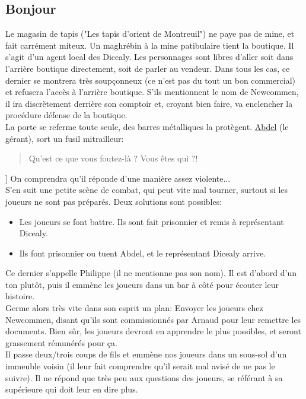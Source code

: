 \documentclass[10pt,a4paper,twocolumn]{article}
\begin{document}
\subsection*{Bonjour}
Le magasin de tapis ("Les tapis d'orient de Montreuil") ne paye pas de mine, et fait carrément miteux. Un maghrébin à la mine patibulaire tient la boutique. Il s'agit d'un agent local des Dicealy. Les personnages sont libres d'aller soit dans l'arrière boutique directement, soit de parler au vendeur. Dans tous les cas, ce dernier se montrera très soupçonneux (ce n'est pas du tout un bon commercial) et refusera l'accès à l'arrière boutique. S'ils mentionnent le nom de Newcommen, il ira discrètement derrière son comptoir et, croyant bien faire, va enclencher la procédure défense de la boutique.\\
La porte se referme toute seule, des barres métalliques la protègent. \hyperlink{abdel}{Abdel} (le gérant), sort un fusil mitrailleur:
\begin{quote}
Qu'est ce que vous foutez-là ? Vous êtes qui ?!
\end{quote}{]}
On comprendra qu'il réponde d'une manière assez violente... \\
S'en suit une petite scène de combat, qui peut vite mal tourner, surtout si les joueurs ne sont pas préparés. Deux solutions sont possibles:
\begin{itemize}
	\item Les joueurs se font battre. Ils sont fait prisonnier et remis à représentant Dicealy.
	\item Ils font prisonnier ou tuent Abdel, et le représentant Dicealy arrive.
\end{itemize}
Ce dernier s'appelle Philippe (il ne mentionne pas son nom). Il est d'abord d'un ton plutôt, puis il emmène les joueurs dans un bar à côté pour écouter leur histoire.\\
Germe alors très vite dans son esprit un plan: Envoyer les joueurs chez Newcommen, disant qu'ils sont commissionnés par Arnaud pour leur remettre les documents. Bien sûr, les joueurs devront en apprendre le plus possibles, et seront grassement rémunérés pour ça. \\
Il passe deux/trois coups de fils et emmène nos joueurs dans un sous-sol d'un immeuble voisin (il leur fait comprendre qu'il serait mal avisé de ne pas le suivre). Il ne répond que très peu aux questions des joueurs, se référant à sa supérieure qui doit leur en dire plus.
\end{document}
